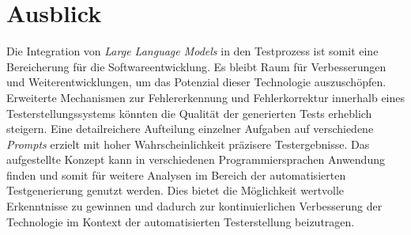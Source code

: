 \section{Ausblick}
Die Integration von \textit{Large Language Models} in den Testprozess ist somit eine Bereicherung für die Softwareentwicklung. Es bleibt Raum für Verbesserungen und Weiterentwicklungen, um das Potenzial dieser Technologie auszuschöpfen. Erweiterte Mechanismen zur Fehlererkennung und Fehlerkorrektur innerhalb eines Testerstellungssystems könnten die Qualität der generierten Tests erheblich steigern. Eine detailreichere Aufteilung einzelner Aufgaben auf verschiedene \textit{Prompts} erzielt mit hoher Wahrscheinlichkeit präzisere Testergebnisse. Das aufgestellte Konzept kann in verschiedenen Programmiersprachen Anwendung finden und somit für weitere Analysen im Bereich der automatisierten Testgenerierung genutzt werden. Dies bietet die Möglichkeit wertvolle Erkenntnisse zu gewinnen und dadurch zur kontinuierlichen Verbesserung der Technologie im Kontext der automatisierten Testerstellung beizutragen.  